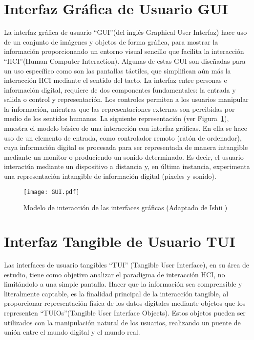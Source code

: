 \section{Interfaz Gráfica de Usuario GUI}
La interfaz gráfica de usuario “GUI”(del inglés Graphical User Interfaz) hace uso de un conjunto de imágenes y objetos de forma gráfica, para mostrar la información proporcionando un entorno visual sencillo que facilita la interacción “HCI”(Human-Computer Interaction). Algunas de estas GUI son diseñadas para un uso específico como son las pantallas táctiles, que simplifican aún más la interacción HCI mediante el sentido del tacto.
La interfaz entre personas e información digital, requiere de dos componentes fundamentales: la entrada y salida o control y representación. Los controles permiten a los usuarios manipular la información, mientras que las representaciones externas son percibidas por medio de los sentidos humanos. La siguiente representación (ver Figura~\ref{fig:GUI}), muestra el modelo básico de una interacción con interfaz gráficas. En ella se hace uso de un elemento de entrada, como controlador remoto (ratón de ordenador), cuya información digital es procesada para ser representada de manera intangible mediante un monitor o produciendo un sonido determinado. Es decir, el usuario interactúa mediante un dispositivo a distancia y, en última instancia, experimenta una representación intangible de información digital (pixeles y sonido).

\begin{figure}[!h]
\begin{center}
\texttt{[image: GUI.pdf]}
\caption{Modelo de interacción de las interfaces gráficas (Adaptado de Ishii \cite{Ishii})}
\label{fig:GUI}
\end{center}
\end{figure}

\section{Interfaz Tangible de Usuario TUI}
Las interfaces de usuario tangibles “TUI” (Tangible User Interface), en su área de estudio, tiene como objetivo analizar el paradigma de interacción HCI, no limitándolo a una simple pantalla. Hacer que la información sea comprensible y literalmente captable, es la finalidad principal de la interacción tangible, al proporcionar representación física de los datos digitales mediante objetos que los representen “TUIOs”(Tangible User Interface Objects). Estos objetos pueden ser utilizados con la manipulación natural de los usuarios, realizando un puente de unión entre el mundo digital y el mundo real.

